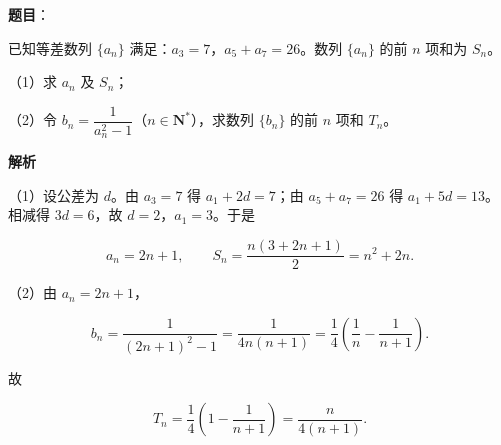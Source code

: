 \begin{answer}

\textbf{题目}：

已知等差数列 $\{a_n\}$ 满足：$a_3=7$，$a_5+a_7=26$。数列 $\{a_n\}$ 的前 $n$ 项和为 $S_n$。

（1）求 $a_n$ 及 $S_n$；

（2）令 $b_n=\dfrac1{a_n^2-1}$（$n\in\mathbf N^*$），求数列 $\{b_n\}$ 的前 $n$ 项和 $T_n$。

\textbf{解析}

（1）设公差为 $d$。由 $a_3=7$ 得 $a_1+2d=7$；由 $a_5+a_7=26$ 得 $a_1+5d=13$。相减得 $3d=6$，故 $d=2$，$a_1=3$。于是

\nopagebreak[4]
\[a_n=2n+1,\qquad S_n=\frac{n(3+2n+1)}2=n^2+2n.\]

（2）由 $a_n=2n+1$，

\nopagebreak[4]
\[b_n=\frac1{(2n+1)^2-1}=\frac1{4n(n+1)}
=\frac14\left(\frac1n-\frac1{n+1}\right).\]

故

\nopagebreak[4]
\[T_n=\frac14\left(1-\frac1{n+1}\right)=\frac{n}{4(n+1)}.\]


\end{answer}
